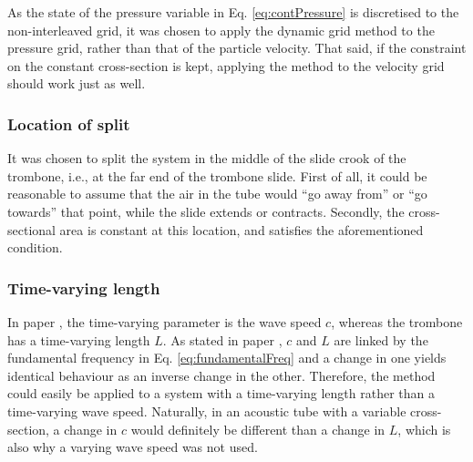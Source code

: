  As the state of the pressure variable in Eq. \eqref{eq:contPressure} is discretised to the non-interleaved grid, it was chosen to apply the dynamic grid method to the pressure grid, rather than that of the particle velocity. That said, if the constraint on the constant cross-section is kept, applying the method to the velocity grid should work just as well.

\subsubsection{Location of split}
It was chosen to split the system in the middle of the slide crook of the trombone, i.e., at the far end of the trombone slide. First of all, it could be reasonable to assume that the air in the tube would ``go away from'' or ``go towards'' that point, while the slide extends or contracts. Secondly, the cross-sectional area is constant at this location, and satisfies the aforementioned condition.

\subsubsection{Time-varying length}
In paper \citeP[G], the time-varying parameter is the wave speed $c$, whereas the trombone has a time-varying length $L$. As stated in paper \citeP[G], $c$ and $L$ are linked by the fundamental frequency in Eq. \eqref{eq:fundamentalFreq} and a change in one yields identical behaviour as an inverse change in the other. Therefore, the method could easily be applied to a system with a time-varying length rather than a time-varying wave speed. Naturally, in an acoustic tube with a variable cross-section, a change in $c$ would definitely be different than a change in $L$, which is also why a varying wave speed was not used.


